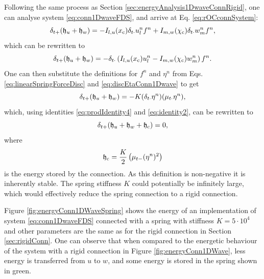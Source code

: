 Following the same process as Section \ref{sec:energyAnalysis1DwaveConnRigid}, one can analyse system \eqref{eq:conn1DwaveFDS}, and arrive at Eq. \eqref{eq:rOCconnSystem}:
\begin{equation*}
    \delta_{t+} (\mathfrak{h}_u + \mathfrak{h}_w) = -I_{l, u}(x_{\text{c}}) \delta_{t\cdot} u_l^n f^n + I_{m, w}(\chi_{\text{c}}) \delta_{t\cdot} w_m^n f^n,
\end{equation*}
which can be rewritten to
\begin{equation*}
    \delta_{t+} (\mathfrak{h}_u + \mathfrak{h}_w) = -\delta_{t\cdot}\left(I_{l, u}(x_{\text{c}}) u_l^n - I_{m, w}(\chi_{\text{c}}) w_m^n\right)f^n.
\end{equation*}
One can then substitute the definitions for $f^n$ and $\eta^n$ from Eqs. \eqref{eq:linearSpringForceDisc} and \eqref{eq:discEtaConn1Dwave} to get
\begin{equation}\label{eq:energyAfterForceSubstitution}
    \delta_{t+} (\mathfrak{h}_u + \mathfrak{h}_w) = -K(\delta_{t\cdot} \eta^n) (\mu_{t\cdot} \eta^n),
\end{equation}
which, using identities \eqref{eq:prodIdentity4} and \eqref{eq:identity2}, can be rewritten to
\begin{equation}
    \delta_{t+} (\mathfrak{h}_u + \mathfrak{h}_w + \mathfrak{h}_{\text{c}}) = 0,
\end{equation}
where
\begin{equation}
    \mathfrak{h}_{\text{c}} = \frac{K}{2}\left(\mu_{t-}(\eta^n)^2\right)
\end{equation}
is the energy stored by the connection. As this definition is non-negative it is inherently stable. The spring stiffness $K$ could potentially be infinitely large, which would effectively reduce the spring connection to a rigid connection.

Figure \ref{fig:energyConn1DWaveSpring} shows the energy of an implementation of system \eqref{eq:conn1DwaveFDS} connected with a spring with stiffness $K=5\cdot 10^4$ and other parameters are the same as for the rigid connection in Section \ref{sec:rigidConn}. One can observe that when compared to the energetic behaviour of the system with a rigid connection in Figure \ref{fig:energyConn1DWave}, less energy is transferred from $u$ to $w$, and some energy is stored in the spring shown in green. 


